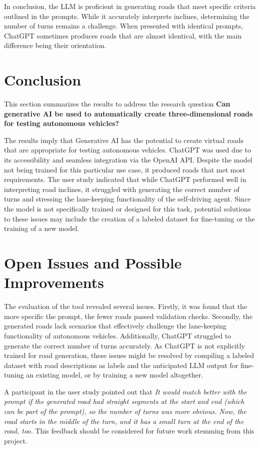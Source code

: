 In conclusion, the LLM is proficient in generating roads that meet specific criteria outlined in the prompts. While it accurately interprets inclines, determining the number of turns remains a challenge. When presented with identical prompts, ChatGPT sometimes produces roads that are almost identical, with the main difference being their orientation.


\section{Conclusion}

This section summarizes the results to address the research question \textbf{Can generative AI be used to automatically create three-dimensional roads for testing autonomous vehicles?}

The results imply that Generative AI has the potential to create virtual roads that are appropriate for testing autonomous vehicles. ChatGPT was used due to its accessibility and seamless integration via the OpenAI API. Despite the model not being trained for this particular use case, it produced roads that met most requirements. The user study indicated that while ChatGPT performed well in interpreting road inclines, it struggled with generating the correct number of turns and stressing the lane-keeping functionality of the self-driving agent. Since the model is not specifically trained or designed for this task, potential solutions to these issues may include the creation of a labeled dataset for fine-tuning or the training of a new model.

\section{Open Issues and Possible Improvements}

The evaluation of the tool revealed several issues. Firstly, it was found that the more specific the prompt, the fewer roads passed validation checks. Secondly, the generated roads lack scenarios that effectively challenge the lane-keeping functionality of autonomous vehicles. Additionally, ChatGPT struggled to generate the correct number of turns accurately. As ChatGPT is not explicitly trained for road generation, these issues might be resolved by compiling a labeled dataset with road descriptions as labels and the anticipated LLM output for fine-tuning an existing model, or by training a new model altogether. 

A participant in the user study pointed out that \textit{It would match better with the prompt if the generated road had straight segments at the start and end (which can be part of the prompt), so the number of turns was more obvious. Now, the road starts in the middle of the turn, and it has a small turn at the end of the road, too.} This feedback should be considered for future work stemming from this project.